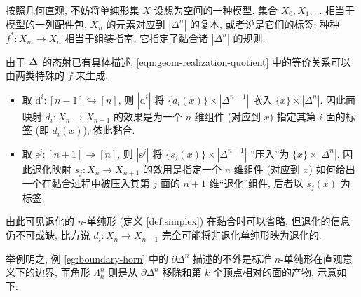 按照几何直观, 不妨将单纯形集 $X$ 设想为空间的一种模型. 集合 $X_0, X_1, \ldots$ 相当于模型的一列配件包, $X_n$ 的元素对应到 $|\Delta^n|$ 的复本, 或者说是它们的标签; 种种 $f^*: X_m \to X_n$ 相当于组装指南, 它指定了黏合诸 $|\Delta^n|$ 的规则.

由于 $\bm\Delta$ 的态射已有具体描述, \eqref{eqn:geom-realization-quotient} 中的等价关系可以由两类特殊的 $f$ 来生成.
\begin{itemize}
	\item 取 $\mathrm{d}^i: [n-1] \hookrightarrow [n]$, 则 $|\mathrm{d}^i|$ 将 $\{ d_i(x) \} \times |\Delta^{n-1}|$ 嵌入 $\{x\} \times |\Delta^n|$. 因此面映射 $d_i: X_n \to X_{n-1}$ 的效果是为一个 $n$ 维组件 (对应到 $x$) 指定其第 $i$ 面的标签 (即 $d_i(x)$), 依此黏合.
	
	\item 取 $\mathrm{s}^j: [n+1] \twoheadrightarrow [n]$, 则 $|\mathrm{s}^j|$ 将 $\{s_j(x)\} \times |\Delta^{n+1}|$ ``压入''为 $\{x\} \times |\Delta^n|$. 因此退化映射 $s_j: X_n \to X_{n+1}$ 的效用是指定一个 $n$ 维组件 (对应到 $x$) 如何给出一个在黏合过程中被压入其第 $j$ 面的 $n+1$ 维``退化''组件, 后者以 $s_j(x)$ 为标签.
\end{itemize}
由此可见退化的 $n$-单纯形 (定义 \ref{def:simplex}) 在黏合时可以省略, 但退化的信息仍不可或缺, 比方说 $d_i: X_n \to X_{n-1}$ 完全可能将非退化单纯形映为退化的.

\begin{example}
	举例明之, 例 \ref{eg:boundary-horn} 中的 $\partial \Delta^n$ 描述的不外是标准 $n$-单纯形在直观意义下的边界, 而角形 $\Lambda^n_k$ 则是从 $\partial \Delta^n$ 移除和第 $k$ 个顶点相对的面的产物, 示意如下:
	\begin{center}\end{center}
\end{example}

